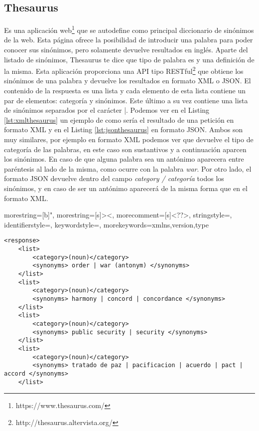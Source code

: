 \subsection{Thesaurus}
\label{cap:subsec:thesaurus}
Es una aplicación web\footnote{https://www.thesaurus.com/} que se autodefine como principal diccionario de sinónimos de la web. Esta página ofrece la posibilidad de introducir una palabra para poder conocer sus sinónimos, pero solamente devuelve resultados en inglés. Aparte del listado de sinónimos,  Thesaurus te dice que tipo de palabra es y una definición de la misma.
Esta aplicación proporciona una API tipo RESTful\footnote{http://thesaurus.altervista.org/} que obtiene los sinónimos de una palabra y devuelve los resultados en formato XML o JSON. El contenido de la respuesta es una lista y cada elemento de esta lista contiene un par de elementos: categoría y sinónimos. Este último a su vez contiene una lista de sinónimos separados por el carácter |. 
Podemos ver en el Listing \ref{lst:xmlthesaurus} un ejemplo de como sería el resultado de una petición en formato XML y en el Listing \ref{lst:jsonthesaurus} en formato JSON.
Ambos son muy similares, por ejemplo en formato XML podemos ver que devuelve el tipo de categoría de las palabras, en este caso son sustantivos y a continuación aparcen los sinónimos. En caso de que alguna palabra sea un antónimo aparecera entre paréntesis al lado de la misma, como ocurre con la palabra \textit{war}. Por otro lado, el formato JSON devuelve dentro del campo \textit{category / categoría} todos los sinónimos, y en caso de ser un antónimo aparecerá de la misma forma que en el formato XML.






{
	morestring=[b]",
	morestring=[s]{>}{<},
	morecomment=[s]{<?}{?>},
	stringstyle=\color{black},
	identifierstyle=\color{darkblue},
	keywordstyle=\color{cyan},
	morekeywords={xmlns,version,type}%
}



\lstset{language=XML}
\begin{lstlisting}[caption= Ejemplo de salida de Thesaurus en formato XML, label={lst:xmlthesaurus}, frame=single]
<response> 
	<list>
		<category>(noun)</category> 
		<synonyms> order | war (antonym) </synonyms>
	</list>
	<list>
		<category>(noun)</category> 
		<synonyms> harmony | concord | concordance </synonyms>
	</list>
	<list>
		<category>(noun)</category> 
		<synonyms> public security | security </synonyms>
	</list>
	<list>
		<category>(noun)</category> 
		<synonyms> tratado de paz | pacificacion | acuerdo | pact | accord </synonyms>
	</list>
\end{lstlisting}





